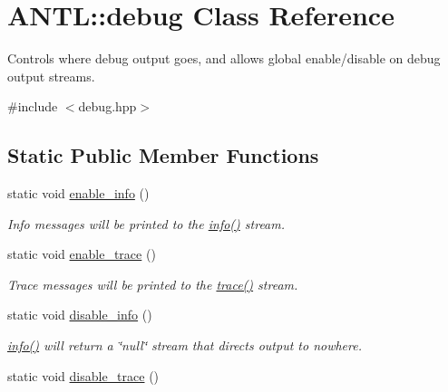 \hypertarget{classANTL_1_1debug}{\section{A\-N\-T\-L\-:\-:debug Class Reference}
\label{classANTL_1_1debug}
}


Controls where debug output goes, and allows global enable/disable on debug output streams.  




{\ttfamily \#include $<$debug.\-hpp$>$}

\subsection*{Static Public Member Functions}
\begin{DoxyCompactItemize}
\item 
\hypertarget{classANTL_1_1debug_ad9eb51e0c1ed9eb02f0931b2ac684cfe}{static void \hyperlink{classANTL_1_1debug_ad9eb51e0c1ed9eb02f0931b2ac684cfe}{enable\-\_\-info} ()}\label{classANTL_1_1debug_ad9eb51e0c1ed9eb02f0931b2ac684cfe}

\begin{DoxyCompactList}\small\item\em Info messages will be printed to the {\ttfamily \hyperlink{classANTL_1_1debug_a6c65903df2cccb3c77df6007e83d7f73}{info()}} stream. \end{DoxyCompactList}\item 
\hypertarget{classANTL_1_1debug_a35f69ed1608a75d399615e13d91b7218}{static void \hyperlink{classANTL_1_1debug_a35f69ed1608a75d399615e13d91b7218}{enable\-\_\-trace} ()}\label{classANTL_1_1debug_a35f69ed1608a75d399615e13d91b7218}

\begin{DoxyCompactList}\small\item\em Trace messages will be printed to the {\ttfamily \hyperlink{classANTL_1_1debug_a3334eff412a87eac62a8c49e940d6984}{trace()}} stream. \end{DoxyCompactList}\item 
\hypertarget{classANTL_1_1debug_a24303c8feda88f7abd37bc82480b0a14}{static void \hyperlink{classANTL_1_1debug_a24303c8feda88f7abd37bc82480b0a14}{disable\-\_\-info} ()}\label{classANTL_1_1debug_a24303c8feda88f7abd37bc82480b0a14}

\begin{DoxyCompactList}\small\item\em {\ttfamily \hyperlink{classANTL_1_1debug_a6c65903df2cccb3c77df6007e83d7f73}{info()}} will return a \char`\"{}null\char`\"{} stream that directs output to nowhere. \end{DoxyCompactList}\item 
\hypertarget{classANTL_1_1debug_a5d9f7f4c40f07ffffddeeef347e043cc}{static void \hyperlink{classANTL_1_1debug_a5d9f7f4c40f07ffffddeeef347e043cc}{disable\-\_\-trace} ()}\label{classANTL_1_1debug_a5d9f7f4c40f07ffffddeeef347e043cc}


\end{DoxyCompactItemize}
